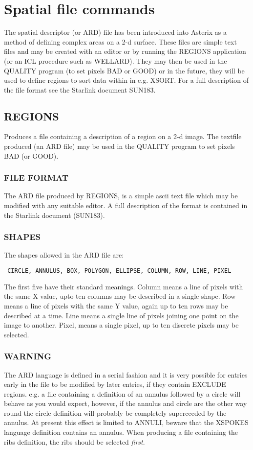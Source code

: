 \documentclass{book}
\renewcommand{\_}{{\tt\char'137}}     %
\begin{document}
\chapter{Spatial file commands}
The spatial descriptor (or ARD) file has been introduced into Asterix
as a method of defining complex areas on a 2-d surface. These files
are simple text files and may be created with an editor or by running
the REGIONS application (or an ICL procedure such as WELLARD). They
may then be used in the QUALITY program (to set pixels BAD or GOOD) or
in the future, they will be used to define regions to sort data within
in e.g. XSORT. For a full description of the file format see the Starlink
document SUN183.

\section{REGIONS}
Produces a file containing a description of a region on a 2-d image.
The textfile produced (an ARD file) may be used in the QUALITY program
to set pixels BAD (or GOOD).

\subsection{FILE FORMAT}
The ARD file produced by REGIONS, is a simple ascii text file which
may be modified with any suitable editor. A full description of the
format is contained in the Starlink document (SUN183).

\subsection{SHAPES}
The shapes allowed in the ARD file are:

\begin{verbatim}
 CIRCLE, ANNULUS, BOX, POLYGON, ELLIPSE, COLUMN, ROW, LINE, PIXEL
\end{verbatim}
The first five have their standard meanings. Column means a line of pixels
with the same X value, upto ten columns may be described in a single
shape. Row means a line of pixels with the same Y value, again up to
ten rows may be described at a time. Line means a single line of pixels
joining one point on the image to another. Pixel, means a single pixel,
up to ten discrete pixels may be selected.

\subsection{WARNING}
The ARD language is defined in a serial fashion and it is very possible
for entries early in the file to be modified by later entries, if they
contain EXCLUDE regions. e.g. a file containing a definition of an
annulus followed by a circle will behave as you would expect, however, if the
annulus and circle are the other way round the circle definition will
probably be completely superceeded by the annulus. At present this
effect is limited to ANNULI, beware that the XSPOKES language definition
contains an annulus. When producing a file containing the ribs definition,
the ribs should be selected {\em first}.
\end{document}
